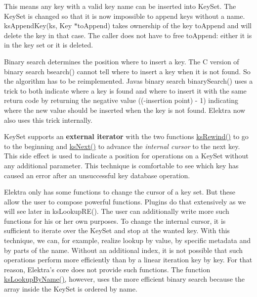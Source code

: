 This means any key with a valid key name can be inserted into {\ttfamily Key\+Set}. The {\ttfamily Key\+Set} is changed so that it is now impossible to append keys without a name. {\ttfamily ks\+Append\+Key(ks, Key $\ast$to\+Append)} takes ownership of the key {\ttfamily to\+Append} and will delete the key in that case. The caller does not have to free {\ttfamily to\+Append}\+: either it is in the key set or it is deleted.

Binary search determines the position where to insert a key. The C version of binary search {\ttfamily bsearch()} cannot tell where to insert a key when it is not found. So the algorithm has to be reimplemented. Java\textquotesingle{}s binary search {\ttfamily binary\+Search()} uses a trick to both indicate where a key is found and where to insert it with the same return code by returning the negative value {\ttfamily ((-\/insertion point) -\/ 1)} indicating where the new value should be inserted when the key is not found. Elektra now also uses this trick internally.

{\ttfamily Key\+Set} supports an {\bfseries external iterator} with the two functions {\ttfamily \hyperlink{group__keyset_gabe793ff51f1728e3429c84a8a9086b70}{ks\+Rewind()}} to go to the beginning and {\ttfamily \hyperlink{group__keyset_ga317321c9065b5a4b3e33fe1c399bcec9}{ks\+Next()}} to advance the {\itshape internal cursor} to the next key. This side effect is used to indicate a position for operations on a {\ttfamily Key\+Set} without any additional parameter. This technique is comfortable to see which key has caused an error after an unsuccessful key database operation.

Elektra only has some functions to change the cursor of a key set. But these allow the user to compose powerful functions. Plugins do that extensively as we will see later in {\ttfamily ks\+Lookup\+R\+E()}. The user can additionally write more such functions for his or her own purposes. To change the internal cursor, it is sufficient to iterate over the {\ttfamily Key\+Set} and stop at the wanted key. With this technique, we can, for example, realize lookup by value, by specific metadata and by parts of the name. Without an additional index, it is not possible that such operations perform more efficiently than by a linear iteration key by key. For that reason, Elektra’s core does not provide such functions. The function {\ttfamily \hyperlink{group__keyset_gad65d2cdcbb5381194a1688e169af8a83}{ks\+Lookup\+By\+Name()}}, however, uses the more efficient binary search because the array inside the {\ttfamily Key\+Set} is ordered by name.


